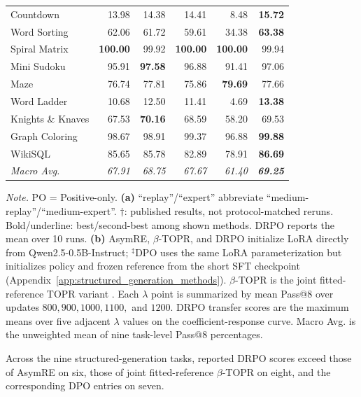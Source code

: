 \documentclass{article}
\theoremstyle{plain}
\theoremstyle{definition}
\theoremstyle{remark}
\begin{document}
\begin{table}[t]
\begin{minipage}[t]{0.515\textwidth}
{\begin{tabular}{@{}lrrrrr@{}}
\midrule
Countdown & 13.98 & 14.38 & 14.41 & 8.48 & \textbf{15.72} \\
Word Sorting & 62.06 & 61.72 & 59.61 & 34.38 & \textbf{63.38} \\
Spiral Matrix & \textbf{100.00} & 99.92 & \textbf{100.00} &
\textbf{100.00} & 99.94 \\
Mini Sudoku & 95.91 & \textbf{97.58} & 96.88 & 91.41 & 97.06 \\
Maze & 76.74 & 77.81 & 75.86 & \textbf{79.69} & 77.66 \\
Word Ladder & 10.68 & 12.50 & 11.41 & 4.69 & \textbf{13.38} \\
Knights \& Knaves & 67.53 & \textbf{70.16} & 68.59 & 58.20 & 69.53 \\
Graph Coloring & 98.67 & 98.91 & 99.37 & 96.88 & \textbf{99.88} \\
WikiSQL & 85.65 & 85.78 & 82.89 & 78.91 & \textbf{86.69} \\
\midrule
\textit{Macro Avg.} & \textit{67.91} & \textit{68.75} & \textit{67.67} &
\textit{61.40} & \textbf{\textit{69.25}} \\
\bottomrule
\end{tabular}
}
\end{minipage}

\vspace{3pt}
\begin{minipage}{0.985\textwidth}
\scriptsize
\textit{Note.} PO = Positive-only. \textbf{(a)} ``replay''/``expert'' abbreviate
``medium-replay''/``medium-expert''. $\dagger$: published results, not
protocol-matched reruns. Bold/underline: best/second-best among shown methods.
DRPO reports the mean over 10 runs. \textbf{(b)} AsymRE, $\beta$-TOPR, and DRPO
initialize LoRA directly from Qwen2.5-0.5B-Instruct; $^{\ddagger}$DPO uses the same LoRA
parameterization but initializes policy and frozen reference from the short SFT
checkpoint (Appendix~\ref{app:structured_generation_methods}). $\beta$-TOPR is
the joint fitted-reference TOPR variant \citep{leroux2025tapered}. Each $\lambda$ point is summarized by mean Pass@8 over updates
$800,900,1000,1100,$ and $1200$. DRPO transfer scores are the maximum
means over five adjacent $\lambda$ values on the coefficient-response curve.
Macro Avg. is the unweighted mean of nine task-level Pass@8 percentages.
\end{minipage}
\end{table}

Across the nine structured-generation tasks, reported DRPO scores exceed
those of AsymRE on six, those of joint fitted-reference $\beta$-TOPR on
eight, and the corresponding DPO entries on seven.
\end{document}
